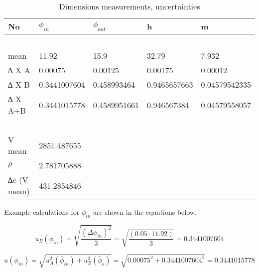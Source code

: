 \begin{table}[!ht]
\begin{tabular}{|l|l|l|l|l|}
        No  & $\phi_{in}$ & $\phi_{out}$ & h & m  \\ \hline
        ~ & ~ & ~ & ~ & ~ \\ \hline
        mean & 11.92 & 15.9 & 32.79 & 7.932 \\ \hline
        ∆ X A & 0.00075 & 0.00125 & 0.00175 & 0.00012 \\ \hline
        ∆ X B & 0.3441007604 & 0.458993464 & 0.9465657663 & 0.04579542335 \\ \hline
        ∆ X A+B & 0.3441015778 & 0.4589951661 & 0.946567384 & 0.04579558057 \\ \hline
        ~ & ~ & ~ & ~ & ~ \\ \hline
        V mean & 2851.487655 & ~ & ~ & ~ \\ \hline
        $\rho$ & 2.781705888 & ~ & ~ & ~ \\ \hline
        ∆c (V mean) & 431.2854846& ~ & ~ & ~  \\ \hline
        
    \end{tabular}
    \caption{Dimensions measurements, uncertainties}
\label{tab:calliper}
\end{table}

Example calculations for $\phi_{in}$ are shown in the equations below.

\begin{equation}
u_B(\phi_{in}) = \sqrt{\frac{(\Delta{\bar\phi_{in}})^2}{3}}=
\sqrt{\frac{(0.05 \cdot 11.92)}{3}} 
=0.3441007604
\end{equation}

\begin{equation}
	u(\phi_{in}) = \sqrt{u_A^2(\bar\phi_{in})+u_B^2(\bar\phi_{o})}
	=\sqrt{0.00075^2+0.3441007604^2}=0.3441015778
\end{equation}


